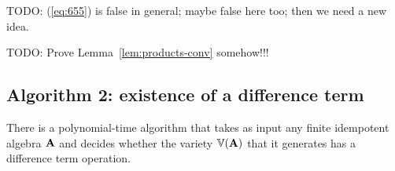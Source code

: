   \smallskip

  TODO: (\ref{eq:655}) is false in general; maybe false here
  too; then we need a new idea.

  \medskip

  TODO: Prove Lemma~\ref{lem:products-conv} somehow!!!



\subsection{Algorithm 2: existence of a difference term}
\label{sec:algor-2}
\begin{cor}
\label{cor:algor-2}
  There is a polynomial-time algorithm that takes as input
  any finite idempotent algebra $\mathbf{A}$ and decides whether
  the variety $\operatorname{\mathbb{V}}(\mathbf{A})$ that it generates
  has a difference term operation.
\end{cor}
